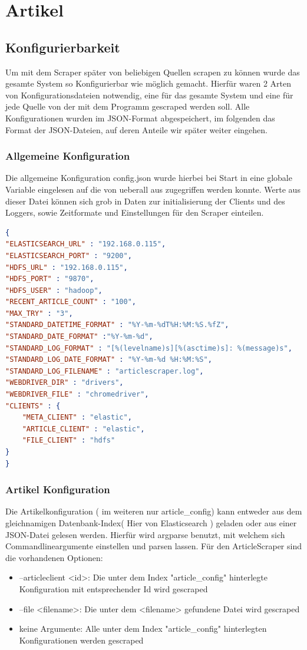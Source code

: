 \documentclass[12pt,twoside,a4paper,parskip]{scrbook}
\begin{document}
\section{Artikel}
\subsection{Konfigurierbarkeit}
Um mit dem Scraper später von beliebigen Quellen scrapen zu können wurde das gesamte System so Konfigurierbar wie möglich gemacht. Hierfür waren 2 Arten von Konfigurationsdateien notwendig, eine für das gesamte System und eine für jede Quelle von der mit dem Programm gescraped werden soll. Alle Konfigurationen wurden im JSON-Format abgespeichert, im folgenden das Format der JSON-Dateien, auf deren Anteile wir später weiter eingehen.
\subsubsection{Allgemeine Konfiguration}
Die allgemeine Konfiguration config.json wurde hierbei bei Start in eine globale Variable eingelesen auf die von ueberall aus zugegriffen werden konnte. Werte aus dieser Datei können sich grob in Daten zur initialisierung der Clients und des Loggers, sowie Zeitformate und Einstellungen für den Scraper einteilen. 
\begin{lstlisting}[caption=config.json,label=config,language=json]
{
"ELASTICSEARCH_URL" : "192.168.0.115",
"ELASTICSEARCH_PORT" : "9200",
"HDFS_URL" : "192.168.0.115",
"HDFS_PORT" : "9870",
"HDFS_USER" : "hadoop",
"RECENT_ARTICLE_COUNT" : "100", 
"MAX_TRY" : "3",
"STANDARD_DATETIME_FORMAT" : "%Y-%m-%dT%H:%M:%S.%fZ",
"STANDARD_DATE_FORMAT" :"%Y-%m-%d",
"STANDARD_LOG_FORMAT" : "[%(levelname)s][%(asctime)s]: %(message)s",
"STANDARD_LOG_DATE_FORMAT" : "%Y-%m-%d %H:%M:%S",
"STANDARD_LOG_FILENAME" : "articlescraper.log",
"WEBDRIVER_DIR" : "drivers",
"WEBDRIVER_FILE" : "chromedriver",
"CLIENTS" : {   
    "META_CLIENT" : "elastic",
    "ARTICLE_CLIENT" : "elastic",
    "FILE_CLIENT" : "hdfs"
}
}
\end{lstlisting}
\subsubsection{Artikel Konfiguration}
Die Artikelkonfiguration ( im weiteren nur article\_config) kann entweder aus dem gleichnamigen Datenbank-Index( Hier von  Elasticsearch ) geladen oder aus einer JSON-Datei gelesen werden. Hierfür wird argparse benutzt, mit welchem sich Commandlineargumente einstellen und parsen lassen. Für den ArticleScraper sind die vorhandenen Optionen:
\begin{itemize}
\item --articleclient <id>: Die unter dem Index "article\_config" hinterlegte Konfiguration mit entsprechender Id wird gescraped
\item --file <filename>: Die unter dem <filename> gefundene Datei wird gescraped
\item keine Argumente: Alle unter dem Index "article\_config" hinterlegten Konfigurationen werden gescraped
\end{itemize}
\end{document}
